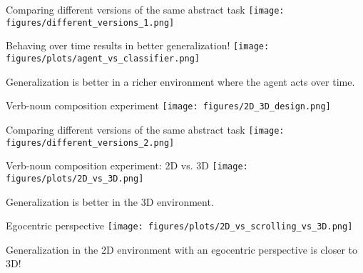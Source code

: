 \documentclass{beamer}
\begin{document}
\begin{frame}{Comparing different versions of the same abstract task}
\centering
\texttt{[image: figures/different\_versions\_1.png]}
\end{frame}

\begin{frame}{Behaving over time results in better generalization!}
\vspace{1em}
\centering
\texttt{[image: figures/plots/agent\_vs\_classifier.png]}
\end{frame}

\begin{frame}[standout]
Generalization is better in a richer environment where the agent acts over time.
\end{frame}

\begin{frame}{Verb-noun composition experiment}
\centering
\texttt{[image: figures/2D\_3D\_design.png]}
\end{frame}

\begin{frame}{Comparing different versions of the same abstract task}
\centering
\texttt{[image: figures/different\_versions\_2.png]}
\end{frame}

\begin{frame}{Verb-noun composition experiment: 2D vs. 3D}
\vspace{1em}
\centering
\texttt{[image: figures/plots/2D\_vs\_3D.png]}
\end{frame}

\begin{frame}[standout]
Generalization is better in the 3D environment.
\end{frame}

\begin{frame}{Egocentric perspective}
\vspace{1em}
\centering
\texttt{[image: figures/plots/2D\_vs\_scrolling\_vs\_3D.png]}
\end{frame}

\begin{frame}[standout]
Generalization in the 2D environment with an egocentric perspective is closer to 3D!
\end{frame}
\end{document}
